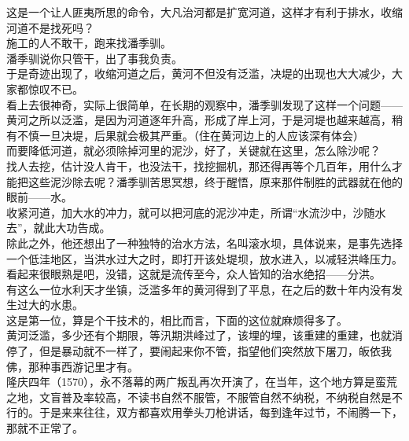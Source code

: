 \begin{multicols}{\theparacolNo}
这是一个让人匪夷所思的命令，大凡治河都是扩宽河道，这样才有利于排水，收缩河道不是找死吗？\\

施工的人不敢干，跑来找潘季驯。\\

潘季驯说你只管干，出了事我负责。\\

于是奇迹出现了，收缩河道之后，黄河不但没有泛滥，决堤的出现也大大减少，大家都惊叹不已。\\

看上去很神奇，实际上很简单，在长期的观察中，潘季驯发现了这样一个问题——黄河之所以泛滥，是因为河道逐年升高，形成了岸上河，于是河堤也越来越高，稍有不慎一旦决堤，后果就会极其严重。（住在黄河边上的人应该深有体会）\\

而要降低河道，就必须除掉河里的泥沙，好了，关键就在这里，怎么除沙呢？\\

找人去挖，估计没人肯干，也没法干，找挖掘机，那还得再等个几百年，用什么才能把这些泥沙除去呢？潘季驯苦思冥想，终于醒悟，原来那件制胜的武器就在他的眼前——水。\\

收紧河道，加大水的冲力，就可以把河底的泥沙冲走，所谓“水流沙中，沙随水去”，就此大功告成。\\

除此之外，他还想出了一种独特的治水方法，名叫滚水坝，具体说来，是事先选择一个低洼地区，当洪水过大之时，即打开该处堤坝，放水进入，以减轻洪峰压力。\\

看起来很眼熟是吧，没错，这就是流传至今，众人皆知的治水绝招——分洪。\\

有这么一位水利天才坐镇，泛滥多年的黄河得到了平息，在之后的数十年内没有发生过大的水患。\\

这是第一位，算是个干技术的，相比而言，下面的这位就麻烦得多了。\\

黄河泛滥，多少还有个期限，等汛期洪峰过了，该埋的埋，该重建的重建，也就消停了，但是暴动就不一样了，要闹起来你不管，指望他们突然放下屠刀，皈依我佛，那种事西游记里才有。\\

隆庆四年（1570），永不落幕的两广叛乱再次开演了，在当年，这个地方算是蛮荒之地，文盲普及率较高，不读书自然不服管，不服管自然不纳税，不纳税自然是不行的。于是来来往往，双方都喜欢用拳头刀枪讲话，每到逢年过节，不闹腾一下，那就不正常了。\\


\end{multicols}
